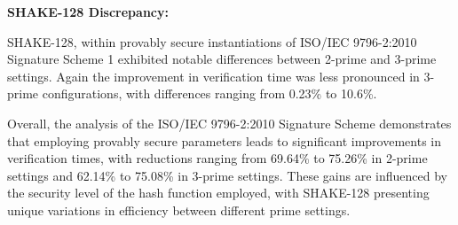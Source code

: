 \documentclass[]{final_report}
\theoremstyle{definition}
\begin{document}
\textbf{SHAKE-128 Discrepancy:} 

SHAKE-128, within provably secure instantiations of ISO/IEC 9796-2:2010 Signature Scheme 1 exhibited notable differences between 2-prime and 3-prime settings. Again the improvement in verification time was less pronounced in 3-prime configurations, with differences ranging from 0.23\%  to 10.6\%. 

Overall, the analysis of the ISO/IEC 9796-2:2010 Signature Scheme demonstrates that employing provably secure parameters leads to significant improvements in verification times, with reductions ranging from 69.64\% to 75.26\% in 2-prime settings and 62.14\% to 75.08\% in 3-prime settings. These gains are influenced by the security level of the hash function employed, with SHAKE-128 presenting unique variations in efficiency between different prime settings.
\end{document}
